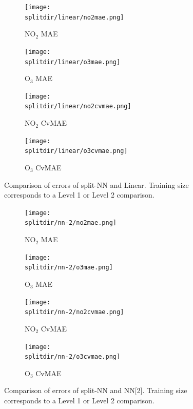 \documentclass[journal abbreviation, manuscript]{copernicus}
\newcommand{\textus}[1]{$_{\text{#1}}$}
\begin{document}
\begin{figure}[H]
\begin{subfigure}{0.49\textwidth}
\texttt{[image: \\splitdir/linear/no2mae.png]}
\caption{NO\textus{2} MAE}
\end{subfigure}
\begin{subfigure}{0.49\textwidth}
\texttt{[image: \\splitdir/linear/o3mae.png]}
\caption{O\textus{3} MAE}
\end{subfigure}
\begin{subfigure}{0.49\textwidth}
\texttt{[image: \\splitdir/linear/no2cvmae.png]}
\caption{NO\textus{2} CvMAE}
\end{subfigure}
\begin{subfigure}{0.49\textwidth}
\texttt{[image: \\splitdir/linear/o3cvmae.png]}
\caption{O\textus{3} CvMAE}
\end{subfigure}
\caption{Comparison of errors of split-NN and Linear. Training size corresponds to a Level 1 or Level 2 comparison.}
\end{figure}

\begin{figure}[H]
\begin{subfigure}{0.49\textwidth}
\texttt{[image: \\splitdir/nn-2/no2mae.png]}
\caption{NO\textus{2} MAE}
\end{subfigure}
\begin{subfigure}{0.49\textwidth}
\texttt{[image: \\splitdir/nn-2/o3mae.png]}
\caption{O\textus{3} MAE}
\end{subfigure}
\begin{subfigure}{0.49\textwidth}
\texttt{[image: \\splitdir/nn-2/no2cvmae.png]}
\caption{NO\textus{2} CvMAE}
\end{subfigure}
\begin{subfigure}{0.49\textwidth}
\texttt{[image: \\splitdir/nn-2/o3cvmae.png]}
\caption{O\textus{3} CvMAE}
\end{subfigure}
\caption{Comparison of errors of split-NN and NN[2]. Training size corresponds to a Level 1 or Level 2 comparison.}
\end{figure}
\end{document}
